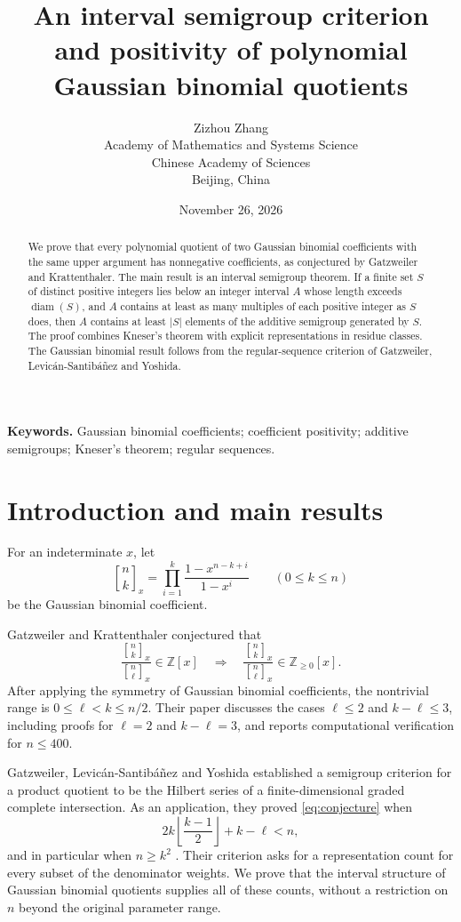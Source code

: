 \documentclass[11pt]{article}
\title{An interval semigroup criterion and positivity of\newline
polynomial Gaussian binomial quotients}
\author{Zizhou Zhang\\[0.5em]
\small Academy of Mathematics and Systems Science\\
\small Chinese Academy of Sciences\\
\small Beijing, China}
\date{November 26, 2026}
\theoremstyle{definition}
\theoremstyle{remark}
\newcommand{\ZZ}{\mathbb Z}
\newcommand{\qbinom}[2]{\genfrac{[}{]}{0pt}{}{#1}{#2}}
\begin{document}
\maketitle

\begin{abstract}
We prove that every polynomial quotient of two Gaussian binomial
coefficients with the same upper argument has nonnegative coefficients,
as conjectured by Gatzweiler and Krattenthaler. The main result is an
interval semigroup theorem. If a finite set $S$ of distinct positive
integers lies below an integer interval $A$ whose length exceeds
$\operatorname{diam}(S)$, and $A$ contains at least as many multiples of
each positive integer as $S$ does, then $A$ contains at least $|S|$
elements of the additive semigroup generated by $S$. The proof combines
Kneser's theorem with explicit representations in residue classes.
The Gaussian binomial result follows from the regular-sequence criterion
of Gatzweiler, Levic\'an-Santib\'a\~nez and Yoshida.
\end{abstract}

\medskip
\noindent\textbf{Keywords.} Gaussian binomial coefficients; coefficient
positivity; additive semigroups; Kneser's theorem; regular sequences.


\section{Introduction and main results}

For an indeterminate $x$, let
\[
 \qbinom{n}{k}_x
 =\prod_{i=1}^{k}\frac{1-x^{n-k+i}}{1-x^i}
 \qquad(0\leq k\leq n)
\]
be the Gaussian binomial coefficient.

Gatzweiler and Krattenthaler \cite[Conjecture~1]{GK} conjectured that
\begin{equation}\label{eq:conjecture}
 \frac{\qbinom{n}{k}_x}{\qbinom{n}{\ell}_x}\in\ZZ[x]
 \quad\Longrightarrow\quad
 \frac{\qbinom{n}{k}_x}{\qbinom{n}{\ell}_x}\in\ZZ_{\geq0}[x].
\end{equation}
After applying the symmetry of Gaussian binomial coefficients, the
nontrivial range is $0\leq\ell<k\leq n/2$. Their paper discusses the
cases $\ell\leq2$ and $k-\ell\leq3$, including proofs for $\ell=2$
and $k-\ell=3$, and reports computational verification for $n\leq400$.

Gatzweiler, Levic\'an-Santib\'a\~nez and Yoshida \cite{GLY} established
a semigroup criterion for a product quotient to be the Hilbert series
of a finite-dimensional graded complete intersection. As an application,
they proved \eqref{eq:conjecture} when
\[
 2k\left\lfloor\frac{k-1}{2}\right\rfloor+k-\ell<n,
\]
and in particular when $n\geq k^2$
\cite[Corollary~3.10]{GLY}. Their criterion asks for a representation
count for every subset of the denominator weights. We prove that the
interval structure of Gaussian binomial quotients supplies all of these
counts, without a restriction on $n$ beyond the original parameter range.
\end{document}
